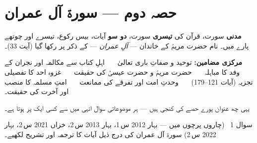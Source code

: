 %

\section*{حصہ دوم --- سورۃ آل عمران}

\begin{nukta}
\textbf{مدنی} سورت، قرآن کی \textbf{تیسری} سورت، \textbf{دو سو} آیات، بیس
رکوع، تیسرے اور چوتھے پارے میں۔ نام حضرت مریمؑ کے خاندان ---
\emph{آلِ عمران} --- کے ذکر پر رکھا گیا (آیت \textenglish{33})۔

\smallskip
\textbf{مرکزی مضامین:} توحید و صفاتِ باری تعالیٰ \ \textbullet\ \ اہلِ کتاب سے
مکالمہ اور نجران کے وفد کا مباہلہ \ \textbullet\ \ حضرت مریمؑ و حضرت عیسیٰؑ کی
حقیقت \ \textbullet\ \ غزوہ احد کا تفصیلی تجزیہ (آیات
\textenglish{121--179}) \ \textbullet\ \ وحدتِ امت اور تفرقے کی ممانعت \
\textbullet\ \ امتِ مسلمہ کا منصب اور آخرت کی حقیقت۔

\smallskip
یہی چھ عنوان پورے حصے کی کنجی ہیں --- ہر موضوعاتی سوال انہی میں سے کسی ایک پر
ہوتا ہے۔
\end{nukta}

\begin{sawal}{سوال \textenglish{1} \ \textnormal{\small(چاروں پرچوں میں --- بہار \textenglish{2012} س\,\textenglish{1}، بہار \textenglish{2013} س\,\textenglish{2}، خزاں \textenglish{2021} س\,\textenglish{2}، بہار \textenglish{2022} س\,\textenglish{2})}}
سورۃ آل عمران کی درج ذیل آیات کا ترجمہ اور تشریح لکھیے۔
\end{sawal}

